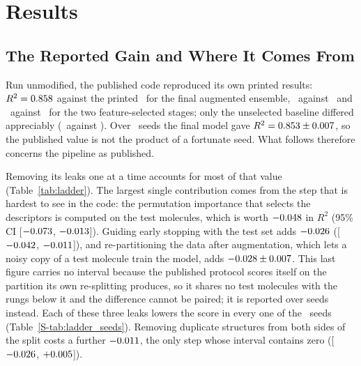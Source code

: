 \section{Results}

\subsection{The Reported Gain and Where It Comes From}
\label{sec:audit_results}

Run unmodified, the published code reproduced its own printed results: $R^2 = 0.858$ against the printed
\KarVerbAugPrintedRTwo\ for the final augmented ensemble, \KarVerbSelAllRerunRTwo\ against \KarVerbSelAllPrintedRTwo\ and
\KarVerbSelFinalRerunRTwo\ against \KarVerbSelFinalPrintedRTwo\ for the two feature-selected stages; only the unselected
baseline differed appreciably (\KarVerbBaselineRerunRTwo\ against \KarVerbBaselinePrintedRTwo). Over \KarReproNSeeds\
seeds the final model gave $R^2 = 0.853 \pm 0.007$, so the published value is not
the product of a fortunate seed. What follows therefore concerns the pipeline as published.

Removing its leaks one at a time accounts for most of that value (Table~\ref{tab:ladder}). The largest single
contribution comes from the step that is hardest to see in the code: the permutation importance that selects the
descriptors is computed on the test molecules, which is worth $-0.048$ in $R^2$ (95\% CI
[$-0.073$, $-0.013$]). Guiding early stopping with the test set adds
$-0.026$ ([$-0.042$, $-0.011$]), and
re-partitioning the data after augmentation, which lets a noisy copy of a test molecule train the model, adds
$-0.028 \pm 0.007$. This last figure carries no interval because the
published protocol scores itself on the partition its own re-splitting produces, so it shares no test molecules with
the rungs below it and the difference cannot be paired; it is reported over seeds instead. Each of these three leaks
lowers the score in every one of the \KarReproNSeeds\ seeds (Table~\ref{S-tab:ladder_seeds}). Removing
duplicate structures from both sides of the split costs a further $-0.011$, the only step
whose interval contains zero ([$-0.026$, $+0.005$]).

